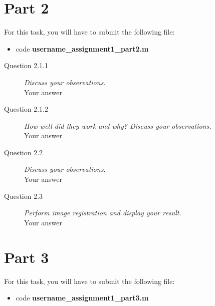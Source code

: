 \documentclass[a4paper, oneside]{article}
\begin{document}
	\section*{Part 2}
	For this task, you will have to submit the following file:
    \begin{itemize}
    \item code \textbf{username\_assignment1\_part2.m}
    \end{itemize}
\begin{description}
    \item [Question 2.1.1]
    \emph{Discuss your observations.}
    \\ Your answer
    \item [Question 2.1.2]
    \emph{How well did they work and why? Discuss your observations.}
    \\ Your answer
    \item [Question 2.2]
    \emph{Discuss your observations.}
    \\ Your answer    
    \item [Question 2.3]
    \emph{Perform image registration and display your result.}
    \\ Your answer
\end{description}

	\section*{Part 3}
	For this task, you will have to submit the following file:
    \begin{itemize}
    \item code \textbf{username\_assignment1\_part3.m}
    \end{itemize}
\end{document}
